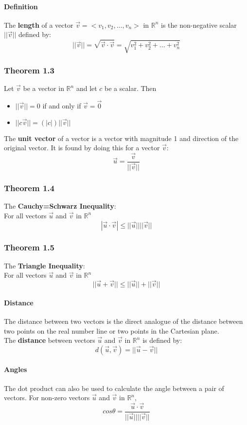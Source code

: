 \documentclass{article}
\newcommand{\p}[1]{\paragraph{#1}} %
\begin{document}
	\p{Definition} The \textbf{length} of a vector $\vec{v}=<v_1,v_2,...,v_n>$ in $\mathbb{R}^n$ is 
	the non-negative scalar $||\vec{v}||$ defined by:
	\[ ||\vec{v}|| = \sqrt{\vec{v}\cdot\vec{v}} = \sqrt{v_1^2+v_2^2+...+v_n^2} \]
	
		\subsubsection{Theorem 1.3}
		Let $\vec{v}$ be a vector in $\mathbb{R}^n$ and let $c$ be a scalar. Then
		\begin{itemize}
			\item{$||\vec{v}|| = 0$ if and only if $\vec{v}=\vec{0}$}
			\item{$||c\vec{v}|| = (|c|)||\vec{v}||$}
		\end{itemize}
	The \textbf{unit vector} of a vector is a vector with magnitude 1 and direction of the original 
	vector. It is found by doing this for a vector $\vec{v}$:
	\[ \vec{u} = \frac{\vec{v}}{||\vec{v}||} \]
	
		\subsubsection{Theorem 1.4}
		The \textbf{Cauchy=Schwarz Inequality}: \\
		For all vectors $\vec{u}$ and $\vec{v}$ in $\mathbb{R}^n$
		\[ |\vec{u}\cdot\vec{v}| \le ||\vec{u}|| ||\vec{v}|| \]
		
		\subsubsection{Theorem 1.5}
		The \textbf{Triangle Inequality}: \\
		For all vectors $\vec{u}$ and $\vec{v}$ in $\mathbb{R}^n$
		\[ ||\vec{u}+\vec{v}|| \le ||\vec{u}||+||\vec{v}|| \]
		
		\p{Distance} The distance between two vectors is the direct analogue of the distance 
		between two points on the real number line or two points in the Cartesian plane. \\
		
		The \textbf{distance} between vectors $\vec{u}$ and $\vec{v}$ in $\mathbb{R}^n$ is 
		defined by: 
		\[ d(\vec{u},\vec{v}) = ||\vec{u}-\vec{v}|| \]
		
		\clearpage
		\p{Angles} The dot product can also be used to calculate the angle between a pair of 
		vectors.
		For non-zero vectors $\vec{u}$ and $\vec{v}$ in $\mathbb{R}^n$,
		\[ cos\theta = \frac{\vec{u}\cdot\vec{v}}{||\vec{u}|| ||\vec{v}||} \]
		
\end{document}
